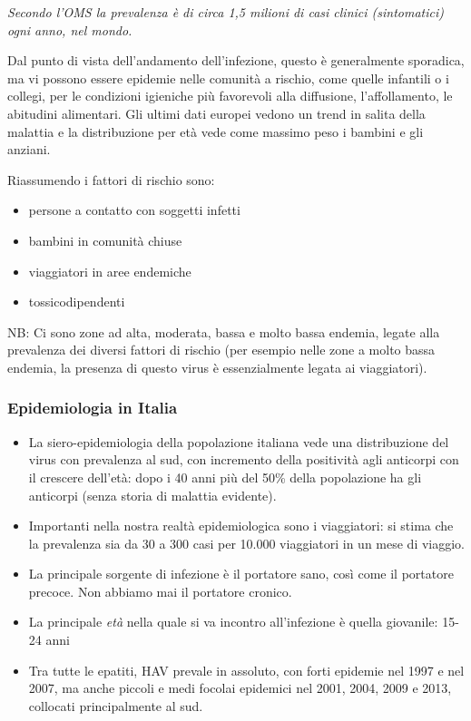 \emph{Secondo l'OMS la prevalenza è di circa 1,5 milioni di casi clinici
(sintomatici) ogni anno, nel mondo.}

Dal punto di vista dell'andamento dell'infezione, questo è generalmente
sporadica, ma vi possono essere epidemie nelle comunità a rischio, come
quelle infantili o i collegi, per le condizioni igieniche più favorevoli
alla diffusione, l'affollamento, le abitudini alimentari. Gli ultimi
dati europei vedono un trend in salita della malattia e la distribuzione
per età vede come massimo peso i bambini e gli anziani.

Riassumendo i fattori di rischio sono:

\begin{itemize}
\item
  persone a contatto con soggetti infetti
\item
  bambini in comunità chiuse
\item
  viaggiatori in aree endemiche
\item
  tossicodipendenti
\end{itemize}

NB: Ci sono zone ad alta, moderata, bassa e molto bassa endemia, legate
alla prevalenza dei diversi fattori di rischio (per esempio nelle zone a
molto bassa endemia, la presenza di questo virus è essenzialmente legata
ai viaggiatori).

\subsubsection{Epidemiologia in Italia}


\begin{itemize}
\item
  La siero-epidemiologia della popolazione italiana vede una
  distribuzione del virus con prevalenza al sud, con incremento della
  positività agli anticorpi con il crescere dell'età: dopo i 40 anni più
  del 50\% della popolazione ha gli anticorpi (senza storia di malattia
  evidente).
\item
  Importanti nella nostra realtà epidemiologica sono i viaggiatori: si
  stima che la prevalenza sia da 30 a 300 casi per 10.000 viaggiatori in
  un mese di viaggio.
\item
  La principale sorgente di infezione è il portatore sano, così come il
  portatore precoce. Non abbiamo mai il portatore cronico.
\item
  La principale \emph{età} nella quale si va incontro all'infezione è
  quella giovanile: 15-24 anni
\item
  Tra tutte le epatiti, HAV prevale in assoluto, con forti epidemie nel
  1997 e nel 2007, ma anche piccoli e medi focolai epidemici nel 2001,
  2004, 2009 e 2013, collocati principalmente al sud.
\end{itemize}

